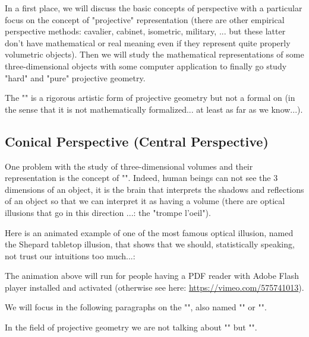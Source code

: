 	In a first place, we will discuss the basic concepts of perspective with a particular focus on the concept of "projective" representation (there are other empirical perspective methods: cavalier, cabinet, isometric, military, ... but these latter don't have mathematical or real meaning even if they represent quite properly volumetric objects). Then we will study the mathematical representations of some three-dimensional objects with some computer application to finally go study "hard" and "pure" projective geometry.
	
	\begin{tcolorbox}[title=Remark,colframe=black,arc=10pt]
	The "" is a rigorous artistic form of projective geometry but not a formal on (in the sense that it is not mathematically formalized... at least as far as we know...).
	\end{tcolorbox}
	
	\pagebreak
	\subsection{Conical Perspective (Central Perspective)}
	One problem with the study of three-dimensional volumes and their representation is the concept of "". Indeed, human beings can not see the $3$ dimensions of an object, it is the brain that interprets the shadows and reflections of an object so that we can interpret it as having a volume (there are optical illusions that go in this direction ...: the "trompe l'oeil").

	Here is an animated example of one of the most famous optical illusion, named the Shepard tabletop illusion, that shows that we should, statistically speaking, not trust our intuitions too much...:
	\begin{center}
	\centering
	\end{center}
	The animation above will run for people having a PDF reader with Adobe Flash player installed and activated (otherwise see here: \url{https://vimeo.com/575741013}).
	
	We will focus in the following paragraphs on the "", also named "" or "".
	
	\begin{tcolorbox}[title=Remark,colframe=black,arc=10pt]
	In the field of projective geometry we are not talking about "" but "".
	\end{tcolorbox}
	
